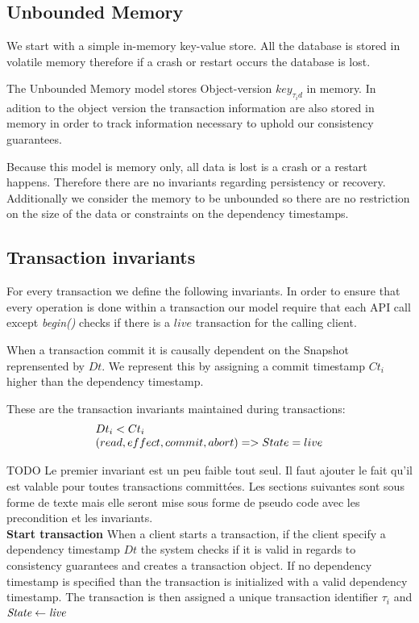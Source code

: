 \documentclass[systeme,french,english]{compas2022}
\begin{document}
\subsection{Unbounded Memory}

We start with a simple in-memory key-value store.
All the database is stored in volatile memory therefore if a crash or restart occurs the database is lost.

The Unbounded Memory model stores Object-version $key_{\tau_id}$ in memory.
In adition to the object version the transaction information are also stored in memory in order to track information necessary to uphold our consistency guarantees.

Because this model is memory only, all data is lost is a crash or a restart happens.
Therefore there are no invariants regarding persistency or recovery.
Additionally we consider the memory to be unbounded so there are no restriction on the size of the data or constraints on the dependency timestamps.

\subsection{Transaction invariants}

For every transaction we define the following invariants.
In order to ensure that every operation is done within a transaction our model require that each API call except \emph{begin()} checks if there is a $live$ transaction for the calling client.

When a transaction commit it is causally dependent on the Snapshot reprensented by $Dt$.
We represent this by assigning a commit timestamp $Ct_i$ higher than the dependency timestamp.

These are the transaction invariants maintained during transactions:
\[
  \begin{array}{lcl}
    \emph{$Dt_i < Ct_i$}\\
    \emph{$(read, effect, commit, abort) => State = live$}
  \end{array} 
\]


TODO Le premier invariant est un peu faible tout seul. Il faut ajouter le fait qu'il est valable pour toutes transactions committées. Les sections suivantes sont sous forme de texte mais elle seront mise sous forme de pseudo code avec les precondition et les invariants.\\


\textbf{Start transaction}
When a client starts a transaction, if the client specify a dependency timestamp $Dt$ the system checks if it is valid in regards to consistency guarantees and creates a transaction object.
If no dependency timestamp is specified than the transaction is initialized with a valid dependency timestamp.
The transaction is then assigned a unique transaction identifier $\tau_i$ and $\emph{State} \leftarrow \emph{live}$ \\
\end{document}
